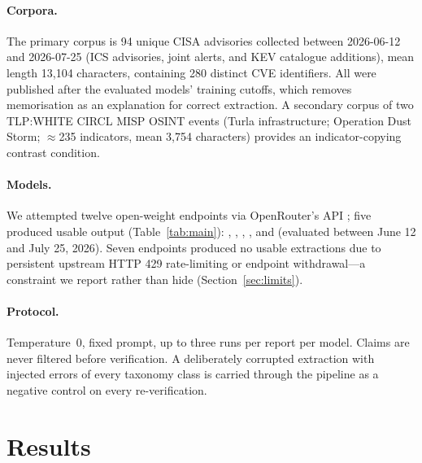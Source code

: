 \documentclass[10pt,twocolumn]{article}
\begin{document}
\paragraph{Corpora.}
The primary corpus is 94 unique CISA advisories \cite{cisaadvisories} collected
between 2026-06-12 and 2026-07-25 (ICS advisories, joint alerts, and KEV
catalogue additions), mean length 13{,}104 characters, containing 280 distinct
CVE identifiers. All were published after the evaluated models' training cutoffs,
which removes memorisation as an explanation for correct extraction. A
secondary corpus of two TLP:WHITE CIRCL MISP OSINT events \cite{circlfeed}
(Turla infrastructure; Operation Dust Storm; $\approx$235 indicators, mean
3{,}754 characters) provides an indicator-copying contrast condition.

\paragraph{Models.}
We attempted twelve open-weight endpoints via OpenRouter's API \cite{openrouter}; five produced usable output
(Table~\ref{tab:main}): , , , , and  (evaluated between June 12 and July 25, 2026). Seven endpoints produced no usable extractions due to persistent upstream HTTP 429 rate-limiting or endpoint withdrawal---a constraint we report rather than hide (Section~\ref{sec:limits}).

\paragraph{Protocol.}
Temperature~0, fixed prompt, up to three runs per report per model. Claims are
never filtered before verification. A deliberately corrupted extraction with
injected errors of every taxonomy class is carried through the pipeline as a
negative control on every re-verification.

\section{Results}
\label{sec:results}
\end{document}
